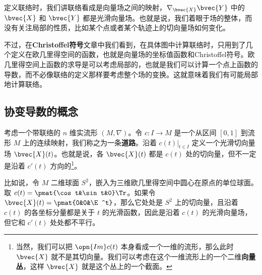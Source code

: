 



定义联络时，我们讲联络看成是向量场之间的映射，$\nabla_{\bvec{X}}\bvec{Y}$ 中的 $\bvec{X}$ 和 $\bvec{Y}$ 都是光滑向量场。也就是说，我们着眼于场的整体，而没有关注局部的性质，比如某个点或者某个轨迹上的切向量场如何变化。

不过，在\textbf{Christoffel符号}文章中我们看到，在具体图中计算联络时，只用到了几个定义在欧几里得空间的函数，也就是向量场的坐标值函数和Christoffel符号。欧几里得空间上函数的求导是可以考虑局部的，也就是我们可以计算一个点上函数的导数，而不必像联络的定义那样要考虑整个场的变换。这就意味着我们有可能局部地计算联络。

\subsection{协变导数的概念}

考虑一个带联络的 $n$ 维实流形 $(M, \nabla)$。令 $c:I\to M$ 是一个从区间 $[0, 1]$ 到流形 $M$ 上的连续映射，我们称之为一条\textbf{道路}。沿着 $c(t)|_{t\in I}$ 定义一个光滑切向量场 $\bvec{X}(t)$。也就是说，各 $\bvec{X}(t)$ 都是 $c(t)$ 处的切向量，但不一定是沿着 $c'(t)$ 方向的\footnote{当然，我们可以把 $\opn{Im}c(t)$ 本身看成一个一维的流形，那么此时 $\bvec{X}$ 就不是其切向量。我们可以考虑在这个一维流形上的一个二维\textbf{向量丛}，这样 $\bvec{X}$ 就是这个丛上的一个截面。}。

比如说，令 $M$ 二维球面 $S^2$，嵌入为三维欧几里得空间中圆心在原点的单位球面。取 $c(t)=\pmat{\cos t&\sin t&0}\Tr$。如果令 $\bvec{X}(t)=\pmat{0&0&\E^t}$，那么它处处是 $S^2$ 上的切向量，且沿着 $c(t)$ 的各坐标分量都是关于 $t$ 的光滑函数，因此是沿着 $c(t)$ 的光滑向量场，但它和 $c'(t)$ 处处都不平行。



